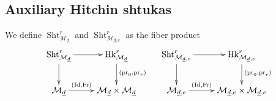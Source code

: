\documentclass[reqno]{amsart}
\numberwithin{equation}{section}
\DeclareMathOperator{\Frob}{Fr}
\DeclareMathOperator{\Id}{Id}
\DeclareMathOperator{\Sht}{Sht}
\DeclareMathOperator{\pr}{pr}
\DeclareMathOperator{\Hk}{Hk}
\newcommand\un{\underline}
\newcommand\cA{\mathcal{A}}
\newcommand\cM{\mathcal{M}}
\newtheorem{lemma}[thm]{Lemma}
\theoremstyle{remark}
\numberwithin{equation}{section}
\begin{document}



\subsection{Auxiliary Hitchin shtukas}
We define $\Sht^{r}_{\cM_{\un d}}$ and $\Sht^{r}_{\cM_{\un d,e}}$ as the fiber product
\begin{equation}\label{defn ShtMde}
\xymatrix{ \Sht^{r}_{\cM_{\un d}}\ar[d] \ar[r] & \Hk^{r}_{\cM_{\un d}}\ar[d]^{(\pr_{0},\pr_{r})}& \Sht^{r}_{\cM_{\un d,e}}\ar[d] \ar[r] & \Hk^{r}_{\cM_{\un d,e}}\ar[d]^{(\pr_{0},\pr_{r})}\\
\cM_{\un d}\ar[r]^-{(\Id, \Frob)} & \cM_{\un d}\times \cM_{\un d} & \cM_{\un d,e}\ar[r]^-{(\Id, \Frob)} & \cM_{\un d,e}\times \cM_{\un d,e}}
\end{equation}
\end{document}
